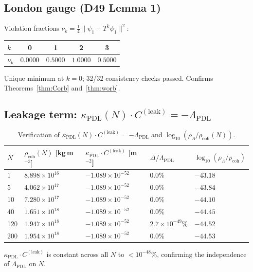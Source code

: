 \documentclass[12pt,a4paper]{article}
\newcommand{\Cleak}{C^{(\mathrm{leak})}}
\newcommand{\rhocoh}{\rho_{\mathrm{coh}}}
\newcommand{\kPDL}{\kappa_{\mathrm{PDL}}}
\newcommand{\LambdaPDL}{\Lambda_{\mathrm{PDL}}}
\newcommand{\rhoLambda}{\rho_\Lambda}
\begin{document}
\subsection{London gauge (D49 Lemma 1)}

Violation fractions $\nu_k = \tfrac{1}{4}\|\psi_1 - T^k\psi_1\|^2$:
\begin{center}
\begin{tabular}{lcccc}
\toprule
$k$ & 0 & 1 & 2 & 3 \\
\midrule
$\nu_k$ & $0.0000$ & $0.5000$ & $1.0000$ & $0.5000$ \\
\bottomrule
\end{tabular}
\end{center}
Unique minimum at $k=0$; 32/32 consistency checks passed. Confirms Theorems~\ref{thm:Corb} and~\ref{thm:worb}.

\subsection{Leakage term: \texorpdfstring{$\kPDL(N)\cdot\Cleak = -\LambdaPDL$}{kappa C\_leak = Lambda}}

\begin{table}[H]
\centering
\caption{Verification of $\kPDL(N)\cdot\Cleak = -\LambdaPDL$ and $\log_{10}(\rhoLambda/\rhocoh(N))$.}
\label{tab:numerics}
\renewcommand{\arraystretch}{1.2}
\begin{tabular}{p{1.0cm}p{3.8cm}p{3.8cm}p{2.5cm}p{2.2cm}}
\toprule
$N$ & $\rhocoh(N)$ [kg\,m$^{-3}$] & $\kPDL\cdot\Cleak$ [m$^{-2}$] & $\Delta/\LambdaPDL$ & $\log_{10}(\rhoLambda/\rhocoh)$ \\
\midrule
1   & $8.898\times10^{16}$ & $-1.089\times10^{-52}$ & $0.0\%$ & $-43.18$ \\
5   & $4.062\times10^{17}$ & $-1.089\times10^{-52}$ & $0.0\%$ & $-43.84$ \\
10  & $7.280\times10^{17}$ & $-1.089\times10^{-52}$ & $0.0\%$ & $-44.10$ \\
40  & $1.651\times10^{18}$ & $-1.089\times10^{-52}$ & $0.0\%$ & $-44.45$ \\
120 & $1.947\times10^{18}$ & $-1.089\times10^{-52}$ & $2.7\times10^{-49}\%$ & $-44.52$ \\
200 & $1.954\times10^{18}$ & $-1.089\times10^{-52}$ & $0.0\%$ & $-44.53$ \\
\bottomrule
\end{tabular}
\end{table}

$\kPDL\cdot\Cleak$ is constant across all $N$ to $<10^{-48}\%$, confirming the independence of $\LambdaPDL$ on $N$.
\end{document}
